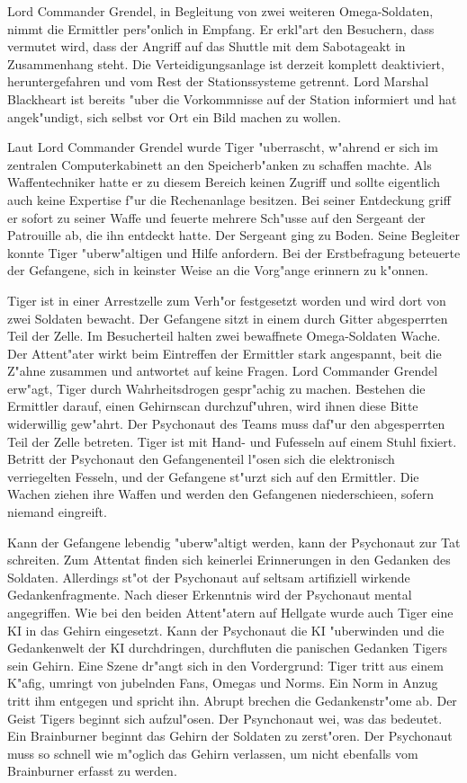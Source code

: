 Lord Commander Grendel, in Begleitung von zwei weiteren Omega-Soldaten, nimmt die Ermittler pers"onlich in Empfang. Er erkl"art den Besuchern, dass vermutet wird, dass der Angriff auf das Shuttle mit dem Sabotageakt in Zusammenhang steht. Die Verteidigungsanlage ist derzeit komplett deaktiviert, heruntergefahren und vom Rest der Stationssysteme getrennt. Lord Marshal Blackheart ist bereits "uber die Vorkommnisse auf der Station informiert und hat angek"undigt, sich selbst vor Ort ein Bild machen zu wollen.

Laut Lord Commander Grendel wurde Tiger "uberrascht, w"ahrend er sich im zentralen Computerkabinett an den Speicherb"anken zu schaffen machte. Als Waffentechniker hatte er zu diesem Bereich keinen Zugriff und sollte eigentlich auch keine Expertise f"ur die Rechenanlage besitzen. Bei seiner Entdeckung griff er sofort zu seiner Waffe und feuerte mehrere Sch"usse auf den Sergeant der Patrouille ab, die ihn entdeckt hatte. Der Sergeant ging zu Boden. Seine Begleiter konnte Tiger "uberw"altigen und Hilfe anfordern. Bei der Erstbefragung beteuerte der Gefangene, sich in keinster Weise an die Vorg"ange erinnern zu k"onnen.

Tiger ist in einer Arrestzelle zum Verh"or festgesetzt worden und wird dort von zwei Soldaten bewacht. Der Gefangene sitzt in einem durch Gitter abgesperrten Teil der Zelle. Im Besucherteil halten zwei bewaffnete Omega-Soldaten Wache. Der Attent"ater wirkt beim Eintreffen der Ermittler stark angespannt, bei\3t die Z"ahne zusammen und antwortet auf keine Fragen. Lord Commander Grendel erw"agt, Tiger durch Wahrheitsdrogen gespr"achig zu machen. Bestehen die Ermittler darauf, einen Gehirnscan durchzuf"uhren, wird ihnen diese Bitte widerwillig gew"ahrt. Der Psychonaut des Teams muss daf"ur den abgesperrten Teil der Zelle betreten. Tiger ist mit Hand- und Fu\3fesseln auf einem Stuhl fixiert. Betritt der Psychonaut den Gefangenenteil l"osen sich die elektronisch verriegelten Fesseln, und der Gefangene st"urzt sich auf den Ermittler. Die Wachen ziehen ihre Waffen und werden den Gefangenen niederschie\3en, sofern niemand eingreift.

Kann der Gefangene lebendig "uberw"altigt werden, kann der Psychonaut zur Tat schreiten. Zum Attentat finden sich keinerlei Erinnerungen in den Gedanken des Soldaten. Allerdings st"o\3t der Psychonaut auf seltsam artifiziell wirkende Gedankenfragmente. Nach dieser Erkenntnis wird der Psychonaut mental angegriffen. Wie bei den beiden Attent"atern auf Hellgate wurde auch Tiger eine KI in das Gehirn eingesetzt.  Kann der Psychonaut die KI "uberwinden und die Gedankenwelt der KI durchdringen, durchfluten die panischen Gedanken Tigers sein Gehirn. Eine Szene dr"angt sich in den Vordergrund: Tiger tritt aus einem K"afig, umringt von jubelnden Fans, Omegas und Norms. Ein Norm in Anzug tritt ihm entgegen und spricht ihn. Abrupt brechen die Gedankenstr"ome ab. Der Geist Tigers beginnt sich aufzul"osen. Der Psynchonaut wei\3, was das bedeutet. Ein Brainburner beginnt das Gehirn der Soldaten zu zerst"oren. Der Psychonaut muss so schnell wie m"oglich das Gehirn verlassen, um nicht ebenfalls vom Brainburner erfasst zu werden.

